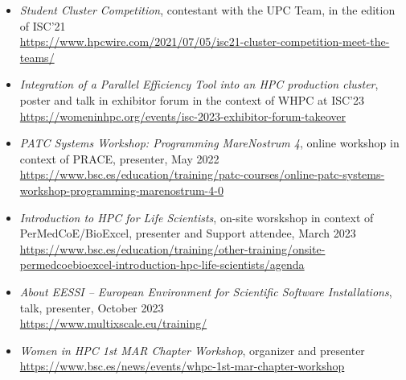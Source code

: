 \begin{itemize}

\item[] \emph{Student Cluster Competition}, contestant with the UPC Team, in the edition of ISC'21
    \\{\small{\url{https://www.hpcwire.com/2021/07/05/isc21-cluster-competition-meet-the-teams/}}}
\item[] \emph{Integration of a Parallel Efficiency Tool into an HPC production cluster}, poster and talk in exhibitor forum in the context of WHPC at ISC'23
    \\{\small{\url{https://womeninhpc.org/events/isc-2023-exhibitor-forum-takeover}}}
\item[] \emph{PATC Systems Workshop: Programming MareNostrum 4}, online workshop in context of PRACE, presenter, May 2022
        \\{\small{\url{https://www.bsc.es/education/training/patc-courses/online-patc-systems-workshop-programming-marenostrum-4-0}}}
\item[] \emph{Introduction to HPC for Life Scientists}, on-site worskshop in context of PerMedCoE/BioExcel, presenter and Support attendee, March 2023
        \\{\small{\url{https://www.bsc.es/education/training/other-training/onsite-permedcoebioexcel-introduction-hpc-life-scientists/agenda}}}
\item[] \emph{About EESSI – European Environment for Scientific Software Installations}, talk, presenter, October 2023
    \\{\small{\url{https://www.multixscale.eu/training/}}}
\item[] \emph{Women in HPC 1st MAR Chapter Workshop}, organizer and presenter
    \\{\small{\url{https://www.bsc.es/news/events/whpc-1st-mar-chapter-workshop}}}

\end{itemize}
